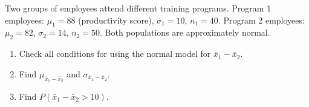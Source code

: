 \documentclass[10pt]{article}
\begin{document}
\namedateperiod

\vspace{0.15in}

Two groups of employees attend different training programs. Program 1 employees:
$\mu_1 = 88$ (productivity score), $\sigma_1 = 10$, $n_1 = 40$. Program 2 employees:
$\mu_2 = 82$, $\sigma_2 = 14$, $n_2 = 50$. Both populations are approximately normal.

\begin{enumerate}
  \item Check all conditions for using the normal model for $\bar{x}_1 - \bar{x}_2$.

  \item Find $\mu_{\bar{x}_1-\bar{x}_2}$ and $\sigma_{\bar{x}_1-\bar{x}_2}$.
        \vspace{0.6in}

  \item Find $P(\bar{x}_1 - \bar{x}_2 > 10)$.
        \vspace{0.8in}
\end{enumerate}
\end{document}

